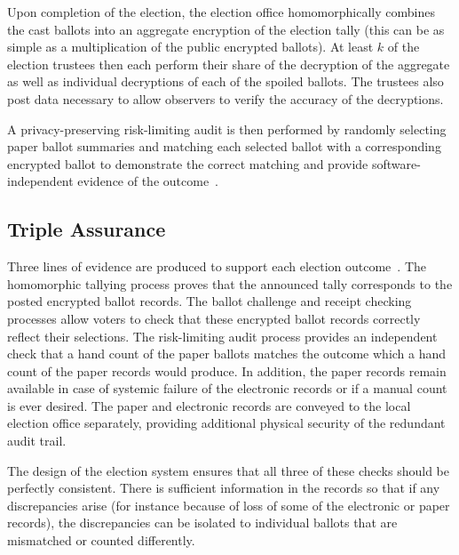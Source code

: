 Upon completion of the election, the election office homomorphically combines the cast ballots into an aggregate encryption of the election tally (this can be as simple as a multiplication of the public encrypted ballots).  At least $k$ of the election trustees then each perform their share of the decryption of the aggregate as well as individual decryptions of each of the spoiled ballots.  The trustees also post data necessary to allow observers to verify the accuracy of the decryptions.

A privacy-preserving risk-limiting audit is then performed by randomly selecting paper ballot summaries and matching each selected ballot with a corresponding encrypted ballot to demonstrate the correct matching and provide software-independent evidence of the outcome~\cite{rivest06sivoting,lindemanStark12,starkWagner12}.

\subsection{Triple Assurance}

Three lines of evidence are produced to support each election outcome~\cite{starkWagner12}.  The homomorphic tallying process proves that the announced tally corresponds to the posted encrypted ballot records.  The ballot challenge and receipt checking processes allow voters to check that these encrypted ballot records correctly reflect their selections.  The risk-limiting audit process provides an independent check that a hand count of the paper ballots matches the outcome which a hand count of the paper records would produce.  In addition, the 
paper records remain available in case of systemic failure of the electronic records or 
if a manual count is ever desired.
The paper and electronic records are conveyed to the local election office separately, providing
additional physical security of the redundant audit trail.

The design of the election system ensures that all three of these checks should be perfectly consistent.  There is sufficient information in the records so that if any discrepancies arise (for instance because of loss of some of the electronic or paper records), the discrepancies can be isolated to individual ballots that are mismatched or counted differently.

